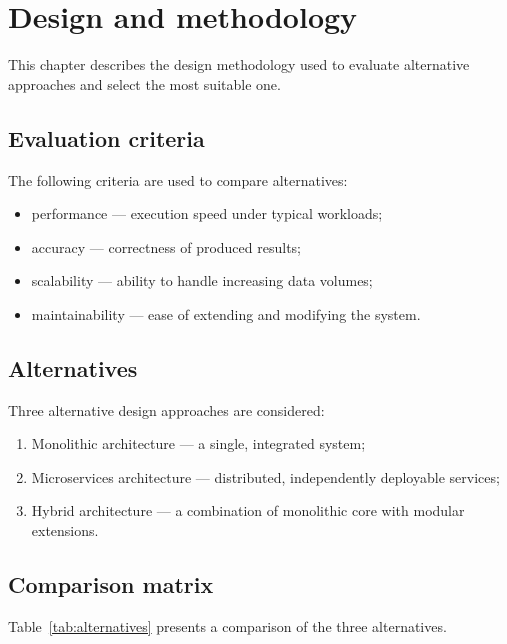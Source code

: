 \section{Design and methodology}

This chapter describes the design methodology used to evaluate alternative approaches and select the most suitable one.

\subsection{Evaluation criteria}

The following criteria are used to compare alternatives:
\begin{itemize}
  \item performance --- execution speed under typical workloads;
  \item accuracy --- correctness of produced results;
  \item scalability --- ability to handle increasing data volumes;
  \item maintainability --- ease of extending and modifying the system.
\end{itemize}

\subsection{Alternatives}

Three alternative design approaches are considered:
\begin{enumerate}
  \item Monolithic architecture --- a single, integrated system;
  \item Microservices architecture --- distributed, independently deployable services;
  \item Hybrid architecture --- a combination of monolithic core with modular extensions.
\end{enumerate}

\subsection{Comparison matrix}

Table~\ref{tab:alternatives} presents a comparison of the three alternatives.

